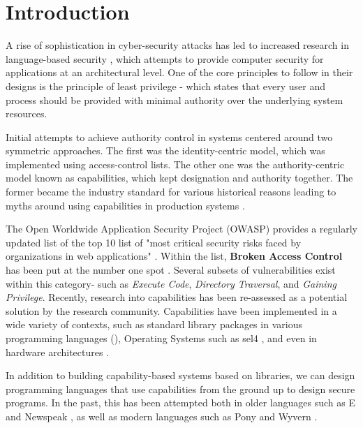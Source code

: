 
\section{Introduction}\label{sec-intro}
\noindent
A rise of sophistication in cyber-security attacks has led to increased research in language-based security \cite{10.1007/11555827_12}, which attempts to provide computer security for applications at an architectural level. One of the core principles to follow in their designs is the principle of least privilege - which states that every user and process should be provided with minimal authority over the underlying system resources. 

Initial attempts to achieve authority control in systems centered around two symmetric approaches. \cite{millerKeynote} The first was the identity-centric model, which was implemented using access-control lists. The other one was the authority-centric model known as capabilities, which kept designation and authority together. The former became the industry standard for various historical reasons leading to myths around using capabilities in production systems \cite{markCapsMyth}. 

The Open Worldwide Application Security Project (OWASP) provides a regularly updated list of the top 10 list of "most critical security risks faced by organizations in web applications" \cite{owaspTop10}. Within the list, \textbf{Broken Access Control} has been put at the number one spot \cite{owaspBrokenAccess}. Several subsets of vulnerabilities exist within this category- such as \textit{Execute Code}, \textit{Directory Traversal}, and \textit{Gaining Privilege}. Recently, research into capabilities has been re-assessed as a potential solution by the research community. Capabilities have been implemented in a wide variety of contexts, such as standard library packages in various programming languages (\cite{rustCap, scalaCaps, goCap}), Operating Systems such as sel4 \cite{sel4}, and even in hardware architectures \cite{watson2018capability}. 

In addition to building capability-based systems based on libraries, we can design programming languages that use capabilities from the ground up to design secure programs. In the past, this has been attempted both in older languages such as E \cite{eProgLang} and Newspeak \cite{newspeakProgLang}, as well as modern languages such as Pony \cite{steed2016principled} and Wyvern \cite{DBLP:wyvern}.


